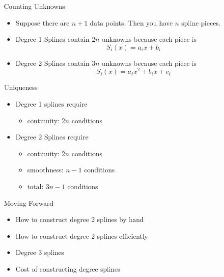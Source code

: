 \documentclass[10pt]{beamer}
\begin{document}
\begin{frame}{Counting Unknowns}
    \begin{itemize}
        \item Suppose there are $n+1$ data points. Then you have $n$ spline pieces.
        \vfill 
        \item Degree 1 Splines contain $2n$ unknowns because each piece is 
        $$
            S_i(x)=a_i x + b_i
        $$
        \vfill 
        \item Degree 2 Splines contain $3n$ unknowns because each piece is 
        $$
            S_i(x)=a_i x^2 + b_i x +c_i
        $$
    \end{itemize}
\end{frame}
\begin{frame}{Uniqueness}
    \begin{itemize}
        \item Degree 1 splines require
        \begin{itemize}
            \item continuity: $2n$ conditions
        
        \end{itemize} 
        \vfill 
        \item Degree 2 Splines require 
        \begin{itemize}
            \item continuity: $2n$ conditions
            \item smoothness: $n-1$ conditions 
            \item total: $3n-1$ conditions
        \end{itemize}
    \end{itemize}
\end{frame}
\begin{frame}{Moving Forward}
\begin{itemize}
    \item How to construct degree 2 splines by hand 
    \vfill 
    \item How to construct degree 2 splines efficiently
    \vfill
    \item Degree 3 splines
    \vfill 
    \item Cost of constructing degree splines
\end{itemize}
\end{frame}
\end{document}
